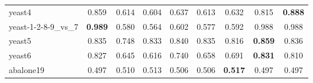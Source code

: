 \begin{table}[!htbp]
{\begin{tabular}{lcccccccc}
			yeast4 & 0.859 & 0.614 & 0.604 & 0.637 & 0.613 & 0.632 & 0.815 & \textbf{0.888} \\
			yeast-1-2-8-9\_vs\_7 & \textbf{0.989} & 0.580 & 0.564 & 0.602 & 0.577 & 0.592 & 0.988 & 0.988 \\
			yeast5 & 0.835 & 0.748 & 0.833 & 0.840 & 0.835 & 0.816 & \textbf{0.859} & 0.836 \\
			yeast6 & 0.827 & 0.645 & 0.616 & 0.740 & 0.658 & 0.691 & \textbf{0.831} & 0.810 \\
			abalone19 & 0.497 & 0.510 & 0.513 & 0.506 & 0.506 & \textbf{0.517} & 0.497 & 0.497 \\
			\bottomrule
		\end{tabular}%
		
	}
	\label{tab:Precision}%
\end{table}%

